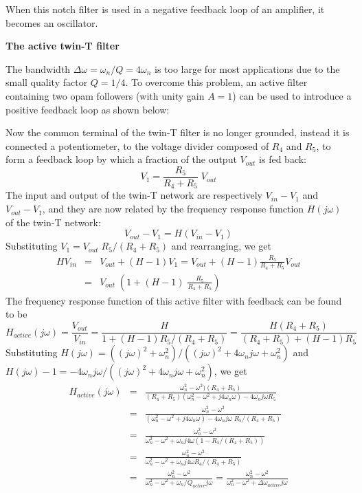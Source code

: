 When this notch filter
is used in a negative feedback loop of an amplifier, it becomes an oscillator.

{\bf The active twin-T filter}

The bandwidth $\Delta\omega=\omega_n/Q=4\omega_n$ is too large for most 
applications due to the small quality factor $Q=1/4$. To overcome this 
problem, an active filter containing two opam followers (with unity gain
$A=1$) can be used to introduce a positive feedback loop as shown below:


Now the common terminal of the twin-T filter is no longer grounded, instead
it is connected a potentiometer, to the voltage divider composed of $R_4$ 
and $R_5$, to form a feedback loop by which a fraction of the output 
$V_{out}$ is fed back:
\[
V_1=\frac{R_5}{R_4+R_5}\;V_{out}
\]
The input and output of the twin-T network are respectively $V_{in}-V_1$ and
$V_{out}-V_1$, and they are now related by the frequency response function 
$H(j\omega)$ of the twin-T network:
\[
V_{out}-V_1=H(V_{in}-V_1)
\]
Substituting $V_1=V_{out}\;R_5/(R_4+R_5)$ and rearranging, we get
\begin{eqnarray}
  HV_{in}&=&V_{out}+(H-1) V_1=V_{out}+(H-1)\frac{R_5}{R_4+R_5}V_{out}
  \nonumber \\
  &=&V_{out}\;\left(1+(H-1)\;\frac{R_5}{R_4+R_5}\right)
  \nonumber
\end{eqnarray}
The frequency response function of this active filter with feedback can be 
found to be
\[
H_{active}(j\omega)=\frac{V_{out}}{V_{in}}=\frac{H}{1+(H-1)R_5/(R_4+R_5)}
=\frac{H(R_4+R_5)}{(R_4+R_5)+(H-1)R_5}
\]
Substituting $H(j\omega)=((j\omega)^2+\omega_n^2)/((j\omega)^2+4\omega_n j\omega
+\omega_n^2)$ and
$H(j\omega)-1=-4\omega_nj\omega/((j\omega)^2+4\omega_nj\omega+\omega_n^2)$, we
get
\begin{eqnarray}
  H_{active}(j\omega)&=&\frac{\omega_n^2-\omega^2)(R_4+R_5)}{(R_4+R_5)
    (\omega_n^2-\omega^2+j4\omega_n \omega)- 4\omega_n j\omega R_5}
  \nonumber \\
  &=&\frac{\omega_n^2-\omega^2}{(\omega_n^2-\omega^2+j4\omega_n\omega)
    -4\omega_n j\omega\;R_5/(R_4+R_5)}
  \nonumber \\
  &=&\frac{\omega_n^2-\omega^2}{\omega_n^2-\omega^2+\omega_n j4\omega(1-R_5/(R_4+R_5))
}
  \nonumber \\
  &=&\frac{\omega_n^2-\omega^2}{\omega_n^2-\omega^2+\omega_n j4\omega R_4/(R_4+R_5)}
  \nonumber \\
  &=&\frac{\omega_n^2-\omega^2}{\omega_n^2-\omega^2+\omega_n/Q_{active} j\omega}
  =\frac{\omega_n^2-\omega^2}{\omega_n^2-\omega^2+\Delta\omega_{active} j\omega}
  \nonumber
\end{eqnarray}
